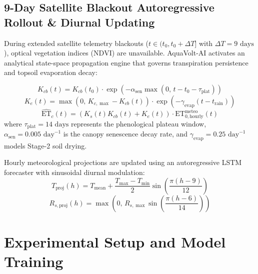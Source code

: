 \documentclass[sn-mathphys-num,Numbered]{sn-jnl}
\begin{document}
\subsection{9-Day Satellite Blackout Autoregressive Rollout \& Diurnal Updating}\label{sec:methods_blackout_rollout}
During extended satellite telemetry blackouts ($t \in (t_0, t_0 + \Delta T]$ with $\Delta T = 9\text{ days}$), optical vegetation indices ($\mathrm{NDVI}$) are unavailable. AquaVolt-AI activates an analytical state-space propagation engine that governs transpiration persistence and topsoil evaporation decay:

\begin{equation}
K_{cb}(t) = K_{cb}(t_0) \cdot \exp\left( -\alpha_{\text{sen}} \max\left(0, \, t - t_0 - \tau_{\text{plat}}\right) \right) \label{eq:kcb_impute}
\end{equation}
\begin{equation}
K_e(t) = \max\left(0, \, K_{c,\max} - K_{cb}(t)\right) \cdot \exp\left( -\gamma_{\text{evap}} (t - t_{\text{rain}}) \right) \label{eq:ke_impute}
\end{equation}
\begin{equation}
\widehat{\mathrm{ET}}_c(t) = \left( K_s(t) K_{cb}(t) + K_e(t) \right) \cdot \mathrm{ET}_{0, \text{hourly}}^{\text{meteo}}(t) \label{eq:imputed_etc}
\end{equation}
where $\tau_{\text{plat}} = 14\text{ days}$ represents the phenological plateau window, $\alpha_{\text{sen}} = 0.005\text{ day}^{-1}$ is the canopy senescence decay rate, and $\gamma_{\text{evap}} = 0.25\text{ day}^{-1}$ models Stage-2 soil drying.

Hourly meteorological projections are updated using an autoregressive LSTM forecaster with sinusoidal diurnal modulation:
\begin{equation}
T_{\text{proj}}(h) = T_{\text{mean}} + \frac{T_{\max} - T_{\min}}{2} \sin\left( \frac{\pi (h - 9)}{12} \right) \label{eq:diurnal_temp}
\end{equation}
\begin{equation}
R_{s, \text{proj}}(h) = \max\left(0, \, R_{s,\max} \sin\left( \frac{\pi (h - 6)}{14} \right)\right) \label{eq:diurnal_rad}
\end{equation}

\section{Experimental Setup and Model Training}\label{sec:experiments}
\end{document}

